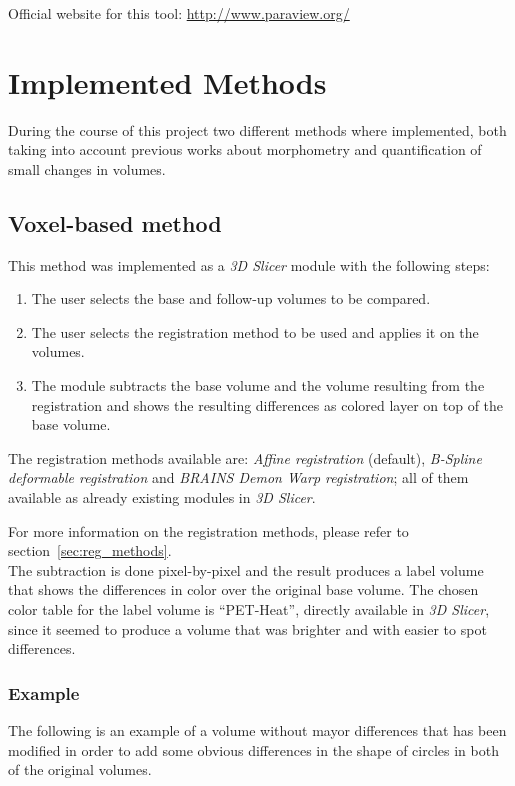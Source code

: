 Official website for this tool: \url{http://www.paraview.org/}

\section{Implemented Methods}
During the course of this project two different methods where
implemented, both taking into account previous works about morphometry
and quantification of small changes in volumes.

\subsection{Voxel-based method}
This method was implemented as a \textit{3D Slicer} module with the following steps:
\begin{enumerate}
\item The user selects the base and follow-up volumes to be compared.
\item The user selects the registration method to be used and applies it on the volumes.
\item The module subtracts the base volume and the volume resulting
  from the registration and shows the resulting differences as colored
  layer on top of the base volume.
\end{enumerate}

The registration methods available are: \textit{Affine registration}
(default), \textit{B-Spline deformable registration} and
\textit{BRAINS Demon Warp registration}; all of them available as
already existing modules in \textit{3D Slicer}.

For more information on the registration methods, please refer to
section~\ref{sec:reg_methods}.\\

The subtraction is done pixel-by-pixel and the result produces a label
volume that shows the differences in color over the original base
volume. The chosen color table for the label volume is ``PET-Heat'',
directly available in \textit{3D Slicer}, since it seemed to produce a
volume that was brighter and with easier to spot differences.

\subsubsection{Example}
The following is an example of a volume without mayor differences that
has been modified in order to add some obvious differences in the
shape of circles in both of the original volumes. 

